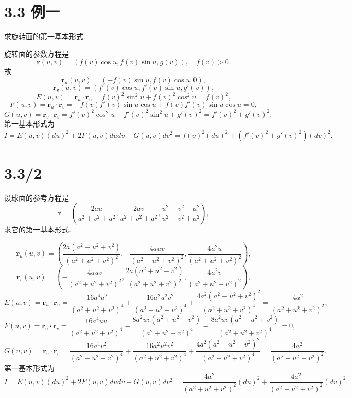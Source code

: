 \documentclass[11pt,a4paper]{article}
\author{刘逸灏 (515370910207)}
\begin{document}
\maketitle

\section*{3.3 例一}
\begin{problem}
  求旋转面的第一基本形式.
\end{problem}

旋转面的参数方程是
$$\mathbf{r}(u,v)=(f(v)\cos u,f(v)\sin u,g(v)), \quad f(v)>0.$$
故
$$\mathbf{r}_u(u,v)=(-f(v)\sin u,f(v)\cos u,0),$$
$$\mathbf{r}_v(u,v)=(f'(v)\cos u,f'(v)\sin u,g'(v)),$$
$$E(u,v)=\mathbf{r}_u\cdot \mathbf{r}_u=f(v)^2\sin^2 u+f(v)^2\cos^2u=f(v)^2,$$
$$F(u,v)=\mathbf{r}_u\cdot \mathbf{r}_v=-f(v)f'(v)\sin u\cos u+f(v)f'(v)\sin u\cos u=0,$$
$$G(u,v)=\mathbf{r}_v\cdot \mathbf{r}_v=f'(v)^2\cos^2 u+f'(v)^2\sin^2u+g'(v)^2=f'(v)^2+g'(v)^2.$$
第一基本形式为
$$I=E(u,v)(du)^2+2F(u,v)dudv+G(u,v)dv^2=f(v)^2(du)^2+(f'(v)^2+g'(v)^2)(dv)^2.$$

\section{3.3/2}
\begin{problem}
  设球面的参考方程是
  $$\mathbf{r}=\left(\frac{2au}{u^2+v^2+a^2},\frac{2av}{u^2+v^2+a^2},\frac{u^2+v^2-a^2}{u^2+v^2+a^2}\right),$$
  求它的第一基本形式.
\end{problem}

$$\mathbf{r}_u(u,v)=\left(\frac{2 a \left(a^2-u^2+v^2\right)}{\left(a^2+u^2+v^2\right)^2},-\frac{4 a u v}{\left(a^2+u^2+v^2\right)^2},\frac{4 a^2 u}{\left(a^2+u^2+v^2\right)^2}\right),$$
$$\mathbf{r}_v(u,v)=\left(-\frac{4 a u v}{\left(a^2+u^2+v^2\right)^2},\frac{2 a \left(a^2+u^2-v^2\right)}{\left(a^2+u^2+v^2\right)^2},\frac{4 a^2 v}{\left(a^2+u^2+v^2\right)^2}\right),$$
$$E(u,v)=\mathbf{r}_u\cdot \mathbf{r}_u=\frac{16 a^4 u^2}{\left(a^2+u^2+v^2\right)^4}+\frac{16 a^2 u^2 v^2}{\left(a^2+u^2+v^2\right)^4}+\frac{4 a^2 \left(a^2-u^2+v^2\right)^2}{\left(a^2+u^2+v^2\right)^4}=\frac{4 a^2}{\left(a^2+u^2+v^2\right)^2},$$
$$F(u,v)=\mathbf{r}_u\cdot \mathbf{r}_v=\frac{16 a^4 u v}{\left(a^2+u^2+v^2\right)^4}-\frac{8 a^2 u v \left(a^2+u^2-v^2\right)}{\left(a^2+u^2+v^2\right)^4}-\frac{8 a^2 u v \left(a^2-u^2+v^2\right)}{\left(a^2+u^2+v^2\right)^4}=0,$$
$$G(u,v)=\mathbf{r}_v\cdot \mathbf{r}_v=\frac{16 a^4 v^2}{\left(a^2+u^2+v^2\right)^4}+\frac{16 a^2 u^2 v^2}{\left(a^2+u^2+v^2\right)^4}+\frac{4 a^2 \left(a^2+u^2-v^2\right)^2}{\left(a^2+u^2+v^2\right)^4}=\frac{4 a^2}{\left(a^2+u^2+v^2\right)^2}.$$
第一基本形式为
$$I=E(u,v)(du)^2+2F(u,v)dudv+G(u,v)dv^2=\frac{4 a^2}{\left(a^2+u^2+v^2\right)^2}(du)^2+\frac{4 a^2}{\left(a^2+u^2+v^2\right)^2}(dv)^2.$$
\end{document}
